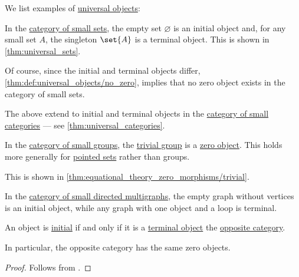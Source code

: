 \begin{example}\label{ex:def:universal_objects}
  We list examples of \hyperref[def:universal_objects]{universal objects}:
  \begin{thmenum}
     In the \hyperref[def:category_of_small_sets]{category of small sets}, the empty set \( \varnothing \) is an initial object and, for any small set \( A \), the singleton \( \set{ A } \) is a terminal object. This is shown in \cref{thm:universal_sets}.

    Of course, since the initial and terminal objects differ, \cref{thm:def:universal_objects/no_zero}, implies that no zero object exists in the category of small sets.

     The above extend to initial and terminal objects in the \hyperref[def:category_of_small_categories]{category of small categories} --- see \cref{thm:universal_categories}.

     In the \hyperref[def:group/category]{category of small groups}, the \hyperref[def:group/trivial]{trivial group} is a \hyperref[def:universal_objects/zero]{zero object}. This holds more generally for \hyperref[def:pointed_set]{pointed sets} rather than groups.

    This is shown in \cref{thm:equational_theory_zero_morphisms/trivial}.

     In the \hyperref[def:directed_multigraph/category]{category of small directed multigraphs}, the empty graph without vertices is an initial object, while any graph with one object and a loop is terminal.
  \end{thmenum}
\end{example}

\begin{proposition}\label{thm:universal_object_duality}
  An object is \hyperref[def:universal_objects/initial]{initial} if and only if it is a \hyperref[def:universal_objects/terminal]{terminal object} the \hyperref[def:opposite_category]{opposite category}.

  In particular, the opposite category has the same zero objects.
\end{proposition}
\begin{proof}
  Follows from .
\end{proof}

